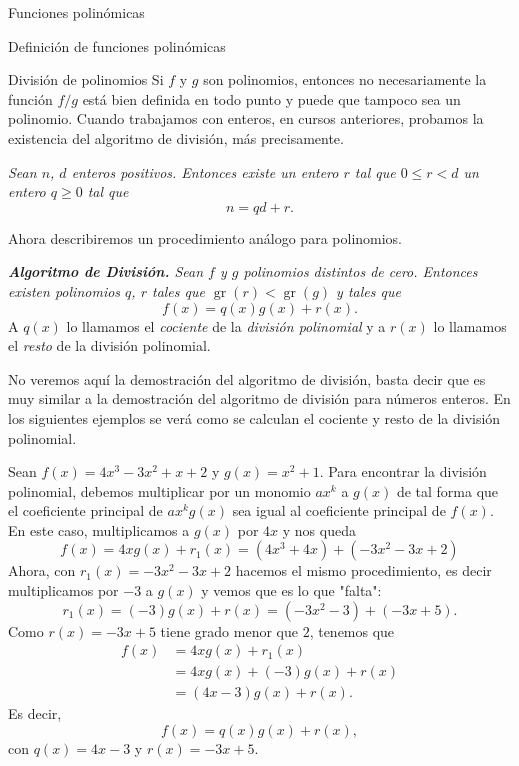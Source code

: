 \begin{chapter}{Funciones polinómicas}
\begin{section}{Definición de funciones polinómicas}
 \end{section}


 \begin{section}{División de polinomios}\label{seccion-division-de-polinomios} Si $f$ y $g$ son polinomios,  entonces no necesariamente la función $f/g$ está bien definida en todo punto y puede que tampoco sea un polinomio. Cuando trabajamos con enteros, en cursos anteriores,  probamos la existencia del algoritmo de división, más precisamente.

  \textit{Sean $n$, $d$ enteros positivos. Entonces existe un entero $r$ tal que
      $0 \le  r <d$  un entero $q \ge 0$ tal que
  }
  \begin{equation*}
      n = qd + r.
  \end{equation*}

  Ahora describiremos un procedimiento análogo para polinomios.

  \textit{\textbf{Algoritmo de División.} Sean $f$ y $g$ polinomios distintos de cero. Entonces existen polinomios $q$, $r$ tales que $\operatorname{gr}(r) < \operatorname{gr}(g)$ y tales que}
  \begin{equation*}
      f (x) = q (x) g (x) + r (x).
  \end{equation*}
  A $q(x)$ lo llamamos el \textit{cociente} de la \textit{división polinomial} y  a $r(x)$ lo llamamos el \textit{resto}  de la división polinomial.

  No veremos aquí la demostración del algoritmo de división, basta decir que es muy similar a  la demostración del algoritmo de división para números enteros. En los siguientes ejemplos se verá como se calculan el cociente y resto de la división polinomial.

  \begin{ejemplo*} Sean $f(x) = 4x^3 - 3x^2 + x + 2$ y $g(x) = x^2 + 1$. Para encontrar la división polinomial, debemos multiplicar por un monomio $ax^k$ a $g(x)$ de tal forma que el coeficiente principal de  $ax^kg(x)$ sea igual al coeficiente principal de $f(x)$. En este caso, multiplicamos a $g(x)$ por $4x$ y nos queda
      \begin{equation*}
          f(x) = 4xg(x) + r_1(x) = (4x^3 +4x)+(-3x^2-3x +2)
      \end{equation*}
      Ahora,  con $r_1(x)=-3x^2-3x +2$ hacemos el mismo procedimiento,  es decir multiplicamos por $-3$  a $g(x)$ y vemos que es lo que "falta":
      \begin{equation*}
          r_1(x) = (-3)g(x) +r(x) = (-3x^2 -3) + (-3x+5).
      \end{equation*}
      Como $r(x) = -3x+5$ tiene grado menor que $2$, tenemos que
      \begin{align*}
          f(x) & = 4xg(x) + r_1(x) \\ &=4xg(x) + (-3)g(x) +r(x)\\& = (4x-3)g(x)+r(x).
      \end{align*}
      Es decir,
      \begin{equation*}
          f(x) = q(x)g(x)+r(x),
      \end{equation*}
      con $q(x) =4x-3$ y $r(x) = -3x+5$.


\end{ejemplo*}
\end{section}
\end{chapter}
